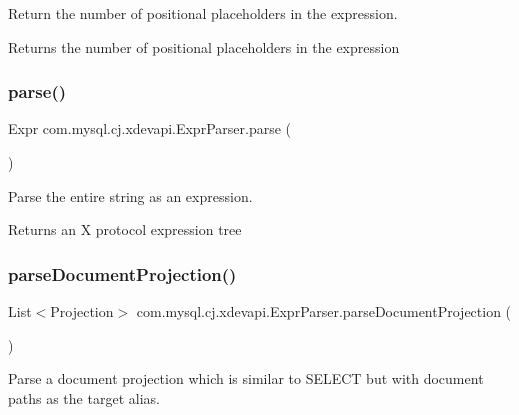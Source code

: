 Return the number of positional placeholders in the expression.

\begin{DoxyReturn}{Returns}
the number of positional placeholders in the expression 
\end{DoxyReturn}
\mbox{\label{classcom_1_1mysql_1_1cj_1_1xdevapi_1_1_expr_parser_a4b585b964454cc26c544d824d33b3498}} 
\subsubsection{\texorpdfstring{parse()}{parse()}}
{\footnotesize\ttfamily Expr com.\+mysql.\+cj.\+xdevapi.\+Expr\+Parser.\+parse (\begin{DoxyParamCaption}{ }\end{DoxyParamCaption})}

Parse the entire string as an expression.

\begin{DoxyReturn}{Returns}
an X protocol expression tree 
\end{DoxyReturn}
\mbox{\label{classcom_1_1mysql_1_1cj_1_1xdevapi_1_1_expr_parser_a93ace436851f9df69c5e69828b19d02c}} 
\subsubsection{\texorpdfstring{parse\+Document\+Projection()}{parseDocumentProjection()}}
{\footnotesize\ttfamily List$<$Projection$>$ com.\+mysql.\+cj.\+xdevapi.\+Expr\+Parser.\+parse\+Document\+Projection (\begin{DoxyParamCaption}{ }\end{DoxyParamCaption})}

Parse a document projection which is similar to S\+E\+L\+E\+CT but with document paths as the target alias.

